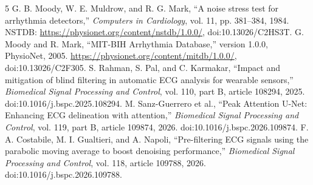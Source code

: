 \documentclass[preprint,12pt]{elsarticle}
\begin{document}
\begin{thebibliography}{5}
 G. B. Moody, W. E. Muldrow, and R. G. Mark, ``A noise stress test for arrhythmia detectors,'' \emph{Computers in Cardiology}, vol. 11, pp. 381--384, 1984. NSTDB: \url{https://physionet.org/content/nstdb/1.0.0/}, doi:10.13026/C2HS3T.
 G. Moody and R. Mark, ``MIT-BIH Arrhythmia Database,'' version 1.0.0, PhysioNet, 2005. \url{https://physionet.org/content/mitdb/1.0.0/}, doi:10.13026/C2F305.
 S. Rahman, S. Pal, and C. Karmakar, ``Impact and mitigation of blind filtering in automatic ECG analysis for wearable sensors,'' \emph{Biomedical Signal Processing and Control}, vol. 110, part B, article 108294, 2025. doi:10.1016/j.bspc.2025.108294.
 M. Sanz-Guerrero et al., ``Peak Attention U-Net: Enhancing ECG delineation with attention,'' \emph{Biomedical Signal Processing and Control}, vol. 119, part B, article 109874, 2026. doi:10.1016/j.bspc.2026.109874.
 F. A. Costabile, M. I. Gualtieri, and A. Napoli, ``Pre-filtering ECG signals using the parabolic moving average to boost denoising performance,'' \emph{Biomedical Signal Processing and Control}, vol. 118, article 109788, 2026. doi:10.1016/j.bspc.2026.109788.
\end{thebibliography}
\end{document}
